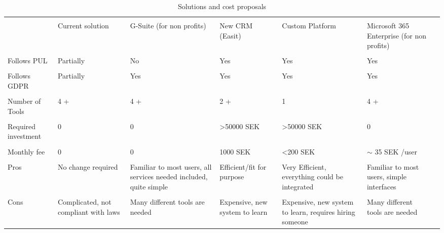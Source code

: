 \begin{table*}[!t]
\centering
\caption{Solutions and cost proposals}
\label{tab:cost-proposals}
\begin{tabularx}{\linewidth}{XXXXXXX} %
\toprule \\
& Current solution    & G-Suite (for non profits)           & New CRM (Easit)                                                  & Custom Platform               & Microsoft 365 Enterprise (for non profits)            &                                          \\
\toprule \\
Follows PUL   		& Partially                           & No                                                               & Yes                           & Yes                                                   & Yes                                      \\
\midrule \\
Follows GDPR      	& Partially                           & Yes                                                              & Yes                           & Yes                                                   & Yes                                      \\
\midrule \\
Number of Tools     & 4 +                                 & 4 +                                                              & 2 +                           & 1                                                     & 4 +                                      \\
\midrule \\
Required investment & 0                                   & 0                                                                & \textgreater 50000 SEK         & \textgreater 50000 SEK                                 & 0                                        \\
\midrule \\
Monthly fee         & 0                                   & 0                                                                & 1000 SEK                       & \textless 200 SEK                                      & $\sim$ 35 SEK /user                       \\
\midrule \\
Pros                & No change required                  & Familiar to most users, all services needed included, quite simple & Efficient/fit for purpose     & Very Efficient, everything could be integrated        & Familiar to most users, simple interfaces \\
\midrule \\
Cons                & Complicated, not compliant with laws & Many different tools are needed                                  & Expensive, new system to learn & Expensive, new system to learn, requires hiring someone & Many different tools are needed \\  
\bottomrule
\end{tabularx}
\end{table*}